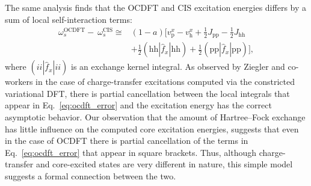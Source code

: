 \documentclass{article}
\begin{document}
The same analysis finds that the OCDFT and CIS excitation energies differs by a sum of  local self-interaction terms:
\begin{align}
\nonumber
\omega^{\text{OCDFT}}_s - \ \omega^{\text{CIS}}_s  \cong &(1 - a) [v_{\text{p}}^x - v_{\text{h}}^x + \frac{1}{2} J_{\text{pp}} - \frac{1}{2} J_{\text{hh}} \\
\label{eq:ocdft_error}
&+ \frac{1}{2} (\text{hh}|\hat{f}_x|\text{hh}) +\frac{1}{2} (\text{pp}|\hat{f}_x|\text{pp})] ,
\end{align}
where $(ii|\hat{f}_x|ii)$
is an exchange kernel integral.
As observed by Ziegler and co-workers in the case of charge-transfer excitations computed via the constricted variational DFT,\cite{ziegler_implementation_2012} there is partial cancellation between the local integrals that appear in Eq.~\eqref{eq:ocdft_error} and the  excitation energy has the correct asymptotic behavior.
Our observation that the amount of Hartree--Fock exchange has little influence on the computed core excitation energies, suggests that even in the case of OCDFT there is partial cancellation of the terms in Eq.~\eqref{eq:ocdft_error} that appear in square brackets.
Thus, although charge-transfer and core-excited states are very different in nature, this simple model suggests a formal connection between the two.
\end{document}

